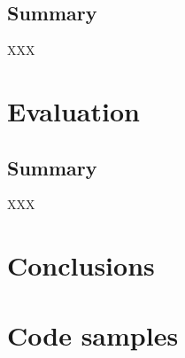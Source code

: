 \documentclass[11pt,chapterprefix=true,toc=bibliography,numbers=noendperiod,
               footnotes=multiple,twoside]{scrreprt}
\begin{document}
\section{Summary}

XXX

\chapter{Evaluation\label{ch:evaluation}}



\section{Summary}

XXX

\chapter{Conclusions\label{ch:conclusions}}


\printbibliography


\appendix

\chapter{Code samples\label{ch:code-samples}}

%
%
\end{document}
